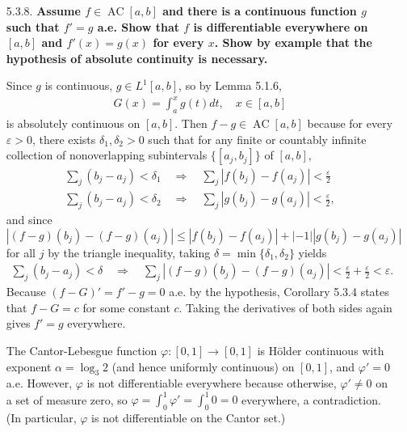 \documentclass[a4paper,12pt]{article}
\DeclareMathOperator*{\AC}{AC}
\begin{document}
\begin{enumerate}
    \item[5.3.8.]
        \boldmath\textbf{Assume $f \in \AC[a, b]$ and there is a continuous function $g$ such that $f' = g$ a.e. Show that $f$ is differentiable everywhere on $[a, b]$ and $f'(x) = g(x)$ for every $x$. Show by example that the hypothesis of absolute continuity is necessary.
        }\unboldmath \par
        \iffalse
            From the Fundamental Theorem of Calculus,
            \begin{align*}
                f(x) - f(a) = \int_a^x f'(t) dt = \int_a^x g(t) dt, \quad x \in [a, b]
            \end{align*}
            since $f'(t) = g(t)$ a.e, and the integral of a continuous function is continuously differentiable. \par
        \fi
        Since $g$ is continuous, $g \in L^1[a, b]$, so by Lemma 5.1.6,
        \begin{align*}
            G(x) = \int_a^x g(t) dt, \quad x \in [a, b]
        \end{align*}
        is absolutely continuous on $[a, b]$. Then $f - g \in \AC[a, b]$ because for every $\varepsilon > 0$, there exists $\delta_1, \delta_2 > 0$ such that for any finite or countably infinite collection of nonoverlapping subintervals $\{[a_j, b_j]\}$ of $[a, b]$,
        \begin{gather*}
            \sum_j (b_j - a_j) < \delta_1 \quad\Longrightarrow\quad \sum_j |f(b_j) - f(a_j)| < \frac{\varepsilon}{2} \\
            \sum_j (b_j - a_j) < \delta_2 \quad\Longrightarrow\quad \sum_j |g(b_j) - g(a_j)| < \frac{\varepsilon}{2},
        \end{gather*}
        and since $|(f - g)(b_j) - (f - g)(a_j)| \leq |f(b_j) - f(a_j)| + |-1||g(b_j) - g(a_j)|$ for all $j$ by the triangle inequality, taking $\delta = \min\{ \delta_1, \delta_2 \}$ yields
        \begin{gather*}
            \sum_j (b_j - a_j) < \delta \quad\Longrightarrow\quad \sum_j |(f - g)(b_j) - (f - g)(a_j)| < \frac{\varepsilon}{2} + \frac{\varepsilon}{2} < \varepsilon.
        \end{gather*}
        Because $(f - G)' = f' - g = 0$ a.e. by the hypothesis, Corollary 5.3.4 states that $f - G = c$ for some constant $c$. Taking the derivatives of both sides again gives $f' = g$ everywhere. \par
        The Cantor-Lebesgue function $\varphi : [0, 1] \to [0, 1]$ is H\"older continuous with exponent $\alpha = \log_3 2$ (and hence uniformly continuous) on $[0, 1]$, and $\varphi' = 0$ a.e. However, $\varphi$ is not differentiable everywhere because otherwise, $\varphi' \neq 0$ on a set of measure zero, so $\varphi = \int_0^1 \varphi' = \int_0^1 0 = 0$ everywhere, a contradiction. (In particular, $\varphi$ is not differentiable on the Cantor set.)


\end{enumerate}
\end{document}
